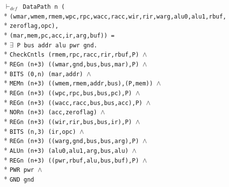 \begin{normalsize}
\hspace*{\fill}
\begin{minipage}{17cm}
$\vdash_{def}$\verb" DataPath n ("\\*
\verb"(wmar,wmem,rmem,wpc,rpc,wacc,racc,wir,rir,warg,alu0,alu1,rbuf,"\\*
\verb"zeroflag,opc),"\\*
\verb"(mar,mem,pc,acc,ir,arg,buf)) ="\\*
$\exists$\verb" P bus addr alu pwr gnd."\\*
\verb"CheckCntls (rmem,rpc,racc,rir,rbuf,P) "$\wedge$\\*
\verb"REGn (n+3) ((wmar,gnd,bus,bus,mar),P) "$\wedge$\\*
\verb"BITS (0,n) (mar,addr) "$\wedge$\\*
\verb"MEMn (n+3) ((wmem,rmem,addr,bus),(P,mem)) "$\wedge$\\*
\verb"REGn (n+3) ((wpc,rpc,bus,bus,pc),P) "$\wedge$\\*
\verb"REGn (n+3) ((wacc,racc,bus,bus,acc),P) "$\wedge$\\*
\verb"NORn (n+3) (acc,zeroflag) "$\wedge$\\*
\verb"REGn (n+3) ((wir,rir,bus,bus,ir),P) "$\wedge$\\*
\verb"BITS (n,3) (ir,opc) "$\wedge$\\*
\verb"REGn (n+3) ((warg,gnd,bus,bus,arg),P) "$\wedge$\\*
\verb"ALUn (n+3) (alu0,alu1,arg,bus,alu) "$\wedge$\\*
\verb"REGn (n+3) ((pwr,rbuf,alu,bus,buf),P) "$\wedge$\\*
\verb"PWR pwr "$\wedge$\\*
\verb"GND gnd"
\end{minipage}
\hspace*{\fill}


\end{normalsize}
